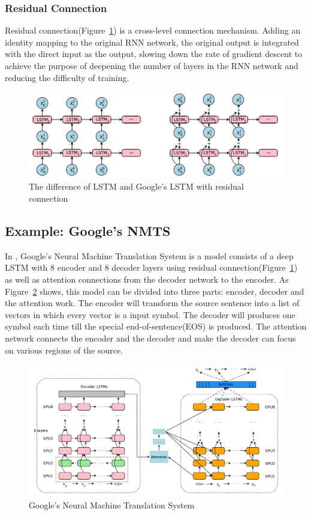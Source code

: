\documentclass[a4paper, 12pt]{article}
\begin{document}
\subsubsection{Residual Connection}
Residual connection(Figure~\ref{fig:residual}) is a cross-level connection mechanism\cite{googleNMTS}. Adding an identity mapping to the original RNN network, the original output is integrated with the direct input as the output, slowing down the rate of gradient descent to achieve the purpose of deepening the number of layers in the RNN network and reducing the difficulty of training.

\begin{figure}[H]
\centering
\includegraphics[scale=0.5]{residualconnection.png}
\caption{\label{fig:residual}The difference of LSTM and Google's LSTM with residual connection}
\end{figure}

\subsection{Example: Google's NMTS}
In \cite{googleNMTS}, Google's Neural Machine Translation System is a model consists of a deep LSTM with $8$ encoder and $8$ decoder layers using residual connection(Figure~\ref{fig:residual}) as well as attention connections from the decoder network to the encoder. As Figure~\ref{fig:googleNMTS} shows, this model can be divided into three parts: encoder, decoder and the attention work. The encoder will transform the source sentence into a list of vectors in which every vector is a input symbol. The decoder will produces one symbol each time till the special end-of-sentence(EOS) is produced. The attention network connects the encoder and the decoder and make the decoder can focus on various regions of the source.

\begin{figure}[H]
\centering
\includegraphics[scale=0.5]{googleNMTS.png}
\caption{\label{fig:googleNMTS}Google's Neural Machine Translation System}
\end{figure}
\end{document}
